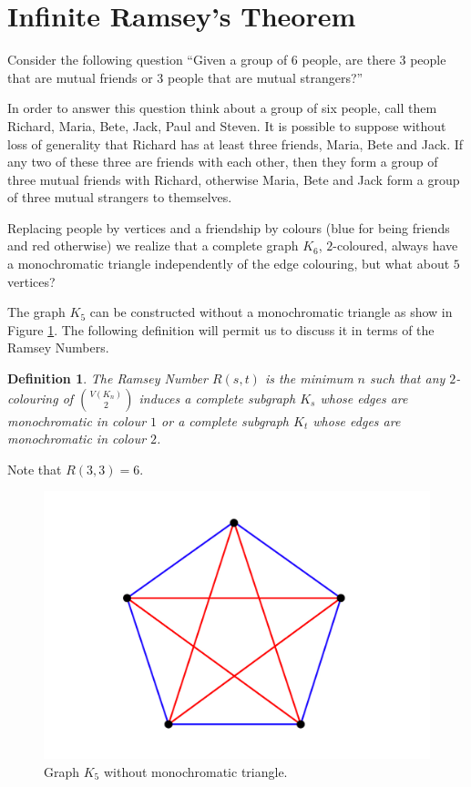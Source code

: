\documentclass[12pt,twoside,a4paper,bibliography=totocnumbered]{book}
\numberwithin{equation}{section}
\newtheorem{definition}	[theorem] {Definition}
\theoremstyle{remark}
\begin{document}
\section{Infinite Ramsey's Theorem}
Consider the following question ``Given a group of 6 people, are there 3 people that are mutual friends or 3 people that are mutual strangers?''

In order to answer this question think about a group of six people, call them Richard, Maria, Bete, Jack, Paul and Steven. It is possible to suppose without loss of generality that Richard has at least three friends, Maria, Bete and Jack. If any two of these three are friends with each other, then they form a group of three mutual friends with Richard, otherwise Maria, Bete and Jack form a group of three mutual strangers to themselves. 

Replacing people by vertices and a friendship by colours (blue for being friends and red otherwise) we realize that a complete graph $K_6$, $2$-coloured, always have a monochromatic triangle independently of the edge colouring, but what about $5$ vertices?

The graph $K_5$ can be constructed without a monochromatic triangle as show in Figure \ref{fig:K5}. The following definition will permit us to discuss it in terms of the Ramsey Numbers.

\begin{definition}\label{def:RamseyNumbers} 
The \emph{Ramsey Number} $R(s,t)$ is the minimum $n$ such that any $2$-colouring of $\binom{V(K_n)}{2}$ induces a complete subgraph $K_s$ whose edges are monochromatic in colour $1$ or a complete subgraph $K_t$ whose edges are monochromatic in colour $2$.
\end{definition}

Note that $R(3,3) = 6$.

\begin{figure}[H]
     \centering
     \includegraphics[scale=1]{Figuras/K5-sem-triangulo.jpg}
     \caption{Graph $K_5$ without monochromatic triangle.}
     \label{fig:K5}
\end{figure}
\end{document}
